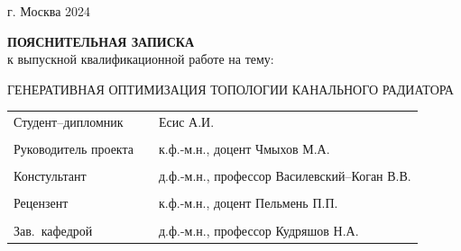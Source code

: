 \documentclass[a4paper,12pt]{extreport}
\numberwithin{equation}{chapter}
\begin{document}
\begin{titlepage}
	\vspace{\fill}
	
	\begin{center}
		г. Москва 2024
	\end{center}
\end{titlepage}

\newpage
\thispagestyle{empty}
\vspace*{3cm}
\begin{center}
	\Large \textbf{ПОЯСНИТЕЛЬНАЯ ЗАПИСКА} \\
	\large {к выпускной квалификационной работе на тему:}
\end{center}

\vspace{1em}

\begin{center}
	\large ГЕНЕРАТИВНАЯ ОПТИМИЗАЦИЯ ТОПОЛОГИИ КАНАЛЬНОГО РАДИАТОРА
\end{center}

\vspace{5em}

\begin{flushleft}
	\begin{longtable}{lcl}
		Студент--дипломник           & \underline{\hspace{2.9cm}} & Есис А.И.                                    \\
		                             &                            &                                              \\
		Руководитель проекта         & \underline{\hspace{2.9cm}} & к.ф.-м.н., доцент Чмыхов М.А.                \\
		                             &                            &                                              \\
		Констультант                 & \underline{\hspace{2.9cm}} & д.ф.-м.н., профессор Василевский--Коган В.В. \\
		                             &                            &                                              \\
		Рецензент                    & \underline{\hspace{2.9cm}} & к.ф.-м.н., доцент Пельмень П.П.              \\
		                             &                            &                                              \\
		Зав.~кафедрой \textnumero 31 & \underline{\hspace{2.9cm}} & д.ф.-м.н., профессор Кудряшов Н.А.
	\end{longtable}
\end{flushleft}
\end{document}
